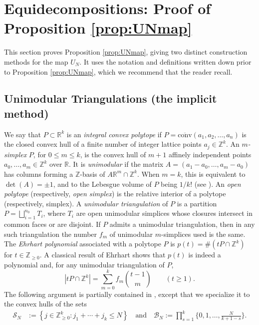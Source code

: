 \documentclass[a4paper,reqno,12pt]{amsart}
\theoremstyle{plain}
\theoremstyle{plain}
\theoremstyle{remark}
\theoremstyle{plain}
\newcommand{\B}{\mathscr{B}}
\newcommand{\cS}{\mathscr{S}}
\newcommand{\z}{\mathbb{Z}}
\newcommand{\RR}{\mathbb{R}}
\newcommand{\Z}{\mathbb{Z}}
\theoremstyle{plain}
\theoremstyle{plain}
\providecommand{\widebar}{\overline}
\begin{document}
{\section{Equidecompositions: Proof of Proposition \ref{prop:UNmap}}
\label{sec:explicitEquidecomposition}

This {section} proves Proposition \ref{prop:UNmap}, giving two distinct construction methods  for the map $U_N$. 
It uses the notation and definitions written down prior to Proposition \ref{prop:UNmap}, which we recommend {that the reader recall}.


\subsection{Unimodular Triangulations (the {implicit} method)}

We say that $P\subset \RR^k$ is an \emph{integral convex polytope} if $P = \widebar{\text{conv}}(a_1,a_2,{\ldots},a_n)$ is the closed convex hull of a finite number of integer lattice points  $a_j \in \z^k$. An \emph{$m$-simplex} $P$, for $0\leq m\leq k$, 
is the convex hull of $m+1$ affinely independent points
$a_0,{\ldots},a_m \in \Z^k$ over $\RR$. It is \emph{unimodular} if the matrix
$
A = (a_1-a_0, \ldots, a_m-a_0)
$
has columns forming a $\Z$-basis of $A\RR^m\cap\Z^k$. When $m=k$, this is equivalent to $\det(A)=\pm1$, and to the Lebesgue volume of $P$ being $1/k!$ (see \cite[Section~2.1 and Definition~2.3.2]{HNP}). An \emph{open polytope} (respectively, \emph{open simplex}) is the relative interior of a polytope (respectively, simplex). A \emph{unimodular triangulation} of $P$ is a partition $P=\bigsqcup_{i=1}^{n_0}T_i$, where $T_i$ are open unimodular simplices{ whose closures intersect in common faces or are disjoint}. {If $P$ admits a unimodular triangulation, then} in any such triangulation the number $f_m$ of unimodular $m$-simplices used is the same. The \emph{Ehrhart polynomial} associated with a polytope $P$ is $p(t)=\#(t P \cap \Z^k)$ for $t\in \Z_{\geq 0}$. A classical result {of} Ehrhart \cite{Ehr} shows that $p(t)$ is indeed a polynomial and{, for any unimodular triangulation of $P$,}
\[
 |tP\cap\mathbb Z^k|=\sum_{m=0}^k f_m\binom{t-1}{m}{\qquad(t\geq1)}.
\]
The following argument is partially contained in {\cite[Proposition~4.3]{HM08}}, except that we specialize it to the convex {hulls} of the sets
\begin{align*}
\cS_N&:=\left\{j\in \Z_{\ge0}^k:
  j_1+\cdots+j_k\le N\right\} \quad \text{and} \quad
\B_N:=\prod_{s=1}^k \bigg\{0,1,\ldots, \frac{N}{k+1-s}\bigg\}.
\end{align*}



}
\end{document}
